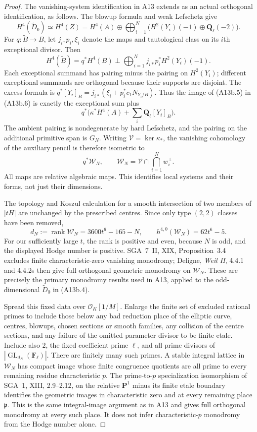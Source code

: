 \documentclass[11pt]{article}
\theoremstyle{remark}\newtheorem{remark}[theorem]{Remark}
\begin{document}
\begin{proof}
The vanishing-system identification in A13 extends as an
actual orthogonal identification, as follows. The blowup
formula and weak Lefschetz give
\[
 H^4(\widetilde D_0)\simeq H^4(Z)
   =H^4(A)\oplus\bigoplus_{i=1}^N
                  \bigl(H^2(Y_i)(-1)\oplus\mathbf Q_\ell(-2)\bigr).
 \tag{A13b.5}
\]
For $q:\widetilde B\to B$, let $j_i,p_i,\xi_i$ denote the
maps and tautological class on its $i$th exceptional divisor.
Then
\[
 H^4(\widetilde B)=q^*H^4(B)\perp
              \bigoplus_{i=1}^N j_{i*}p_i^*H^2(Y_i)(-1).
 \tag{A13b.6}
\]
Each exceptional summand has pairing minus the pairing on
$H^2(Y_i)$; different exceptional summands are orthogonal
because their supports are disjoint. The excess formula is
$q^*[Y_i]_B=j_{i*}(\xi_i+p_i^*c_1N_{Y_i/B})$. Thus the image
of (A13b.5) in (A13b.6) is exactly the exceptional sum plus
\[
             q^*\bigl(\kappa^*H^4(A)+\sum_i\mathbf Q_\ell[Y_i]_B\bigr).
\]
The ambient pairing is nondegenerate by hard Lefschetz, and
the pairing on the additional primitive span is $G_N$.
Writing $\mathcal V=\ker\kappa_*$, the vanishing cohomology
of the auxiliary pencil is therefore isometric to
\[
 q^*\mathcal W_N,
 \qquad
 \mathcal W_N=\mathcal V\cap\bigcap_{i=1}^Nw_i^\perp.
 \tag{A13b.7}
\]
All maps are relative algebraic maps. This identifies local
systems and their forms, not just their dimensions.

The topology and Koszul calculation for a smooth intersection
of two members of $|tH|$ are unchanged by the prescribed
centres. Since only type $(2,2)$ classes have been removed,
\[
 d_N:=\operatorname{rank}\mathcal W_N=3600t^6-165-N,
 \qquad h^{4,0}(\mathcal W_N)=62t^6-5.
 \tag{A13b.8}
\]
For our sufficiently large $t$, the rank is positive and even,
because $N$ is odd, and the displayed Hodge number is positive.
SGA~7~II, XIX, Proposition~3.4 excludes finite characteristic-zero
vanishing monodromy; Deligne, \emph{Weil II}, 4.4.1 and 4.4.2s
then give full orthogonal geometric monodromy on $\mathcal W_N$.
These are precisely the primary monodromy results used in A13,
applied to the odd-dimensional $\widetilde D_0$ in (A13b.4).

Spread this fixed data over $\mathcal O_K[1/M]$. Enlarge the
finite set of excluded rational primes to include those below
any bad reduction place of the elliptic curve, centres, blowups,
chosen sections or smooth families, any collision of the centre
sections, and any failure of the omitted parameter divisor to
be finite etale. Include also $2$, the fixed coefficient prime
$\ell$, and all prime divisors of $|\operatorname{GL}_{d_N}
(\mathbf F_\ell)|$. There are finitely many such primes.
A stable integral lattice in $\mathcal W_N$ has compact image
whose finite congruence quotients are all prime to every
remaining residue characteristic $p$. The prime-to-$p$
specialization isomorphism of SGA~1, XIII, 2.9--2.12, on
the relative $\mathbf P^1$ minus its finite etale boundary
identifies the geometric images in characteristic zero and
at every remaining place $\mathfrak p$. This is the same
integral-image argument as in A13 and gives full orthogonal
monodromy at every such place. It does not infer
characteristic-$p$ monodromy from the Hodge number alone.


\end{proof}
\end{document}
